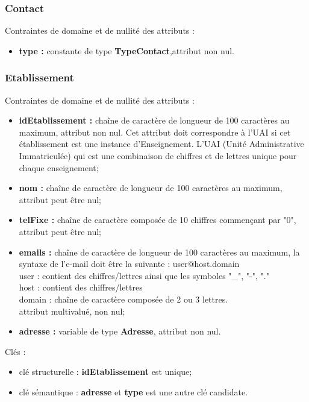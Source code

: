 \subsubsection*{Contact}
Contraintes de domaine et de nullité des attributs :
 \begin{itemize}
 \item \textbf{type :} constante de type \textbf{TypeContact},attribut non nul.\\
 \end{itemize}

\subsubsection*{Etablissement}
Contraintes de domaine et de nullité des attributs :
\begin{itemize}
 	\item \textbf{idEtablissement :} chaîne de caractère de longueur de 100 caractères au maximum, attribut non nul. Cet attribut doit correspondre à l'UAI si cet établissement est une instance d'Enseignement. L'UAI (Unité Administrative Immatriculée) qui est une combinaison de chiffres et de lettres unique pour chaque enseignement;
	\item \textbf{nom :} chaîne de caractère de longueur de 100 caractères au maximum, attribut peut être nul;
	\item \textbf{telFixe :} chaîne de caractère composée de 10 chiffres commençant par "0", attribut peut être nul;
	\item \textbf{emails :} chaîne de caractère de longueur de 100 caractères au maximum, la syntaxe de l'e-mail doit être la suivante : user@host.domain\\
	user : contient des chiffres/lettres ainsi que les symboles "\_", "-", "." \\
	host : contient des chiffres/lettres \\
	domain : chaîne de caractère composée de 2 ou 3 lettres. \\
	attribut multivalué, non nul; 
	\item \textbf{adresse :} variable de type \textbf{Adresse}, attribut non nul.\\
\end{itemize}  

Clés : 
\begin{itemize}
\item clé structurelle : \textbf{idEtablissement} est unique;
\item clé sémantique : \textbf{adresse} et \textbf{type} est une autre clé candidate. \\ 
\end{itemize}

